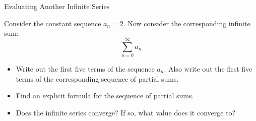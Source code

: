 \begin{exercise}{Evaluating Another Infinite Series \Coffeecup \Coffeecup}

Consider the constant sequence $ a_n=2$.  Now consider the corresponding infinite sum: $$ \sum_{n=0}^{\infty} a_n$$
\begin{itemize}

\item Write out the first five terms of the sequence $a_n$.  Also write out the first five terms of the corresponding sequence of partial sums.

\vspace*{.5in}

\item  Find an explicit formula for the sequence of partial sums.

\vspace*{.5in}

\item Does the infinite series converge?  If so, what value does it converge to?

\vspace*{.5in}
\end{itemize}
\end{exercise}

